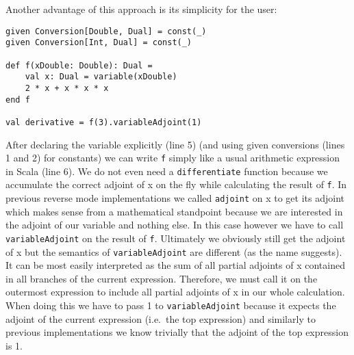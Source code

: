 Another advantage of this approach is its simplicity for the user:
\begin{lstlisting}
given Conversion[Double, Dual] = const(_)
given Conversion[Int, Dual] = const(_)

def f(xDouble: Double): Dual =
    val x: Dual = variable(xDouble)
    2 * x + x * x * x
end f

val derivative = f(3).variableAdjoint(1)
\end{lstlisting}
After declaring the variable explicitly (line 5) (and using given conversions (lines 1 and 2) for constants) we can write \lstinline{f} simply like a usual arithmetic expression in Scala (line 6). We do not even need a \lstinline{differentiate} function because we accumulate the correct adjoint of x on the fly while calculating the result of \lstinline{f}. In previous reverse mode implementations we called \lstinline{adjoint} on x to get its adjoint which makes sense from a mathematical standpoint because we are interested in the adjoint of our variable and nothing else. In this case however we have to call \lstinline{variableAdjoint} on the result of \lstinline{f}. Ultimately we obviously still get the adjoint of x but the semantics of \lstinline{variableAdjoint} are different (as the name suggests). It can be most easily interpreted as the sum of all partial adjoints of x contained in all branches of the current expression. Therefore, we must call it on the outermost expression to include all partial adjoints of x in our whole calculation. When doing this we have to pass 1 to \lstinline{variableAdjoint} because it expects the adjoint of the current expression (i.e.\ the top expression) and similarly to previous implementations we know trivially that the adjoint of the top expression is 1.